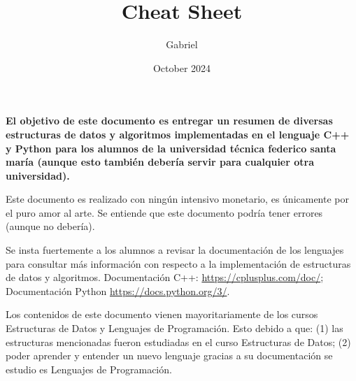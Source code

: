 \documentclass{article}
\title{\footnotesize Cheat Sheet}
\author{\footnotesize Gabriel }
\date{\footnotesize October 2024}
\begin{document}
\scriptsize
\maketitle

{
  \bf El objetivo de este documento es entregar un resumen de diversas estructuras de datos y algoritmos implementadas en el lenguaje C++ y Python para los alumnos de la universidad técnica federico santa maría (aunque esto también debería servir para cualquier otra universidad).

  Este documento es realizado con ningún intensivo monetario, es únicamente por el puro amor al arte. Se entiende que este documento podría tener errores (aunque no debería).

  Se insta fuertemente a los alumnos a revisar la documentación de los lenguajes para consultar más información con respecto a la implementación de estructuras de datos y algoritmos. Documentación C++: \href{https://cplusplus.com/doc/}{https://cplusplus.com/doc/}; Documentación Python \href{https://docs.python.org/3/}{https://docs.python.org/3/}.

  Los contenidos de este documento vienen mayoritariamente de los cursos Estructuras de Datos y Lenguajes de Programación. Esto debido a que: (1) las estructuras mencionadas fueron estudiadas en el curso Estructuras de Datos; (2) poder aprender y entender un nuevo lenguaje gracias a su documentación se estudio es Lenguajes de Programación.
}
\end{document}
